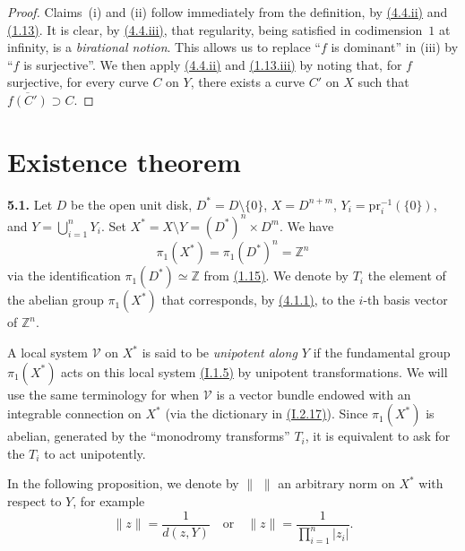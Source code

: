 \documentclass{report}
\newenvironment{rmenv}[1]
  {\phantomsection\par\medskip\noindent\textbf{#1.}\rmfamily}
  {\par\medskip}
\renewcommand{\cal}[1]{{\mathcal{#1}}}
\newcommand{\ZZ}{\mathbb{Z}}
\newcommand{\pr}{\mathrm{pr}}
\newcommand{\oldpage}[1]{\marginpar{\footnotesize$\Big\vert$ \textit{p.~#1}}}
\begin{document}
\begin{proof}
  Claims~(i) and (ii) follow immediately from the definition, by \hyperref[II.4.4]{(4.4.ii)}
\oldpage{91}
  and \hyperref[II.1.13]{(1.13)}.
  It is clear, by \hyperref[II.4.4]{(4.4.iii)}, that regularity, being satisfied in codimension~$1$ at infinity, is a \emph{birational notion}.
  This allows us to replace ``$f$ is dominant'' in (iii) by ``$f$ is surjective''.
  We then apply \hyperref[II.4.4]{(4.4.ii)} and \hyperref[II.1.13]{(1.13.iii)} by noting that, for $f$ surjective, for every curve $C$ on $Y$, there exists a curve $C'$ on $X$ such that $\overline{f(C')}\supset C$.
\end{proof}



\section{Existence theorem}
\label{II.5}

\begin{rmenv}{5.1}
\label{II.5.1}
  Let $D$ be the open unit disk, $D^*=D\setminus\{0\}$, $X=D^{n+m}$, $Y_i=\pr_i^{-1}(\{0\})$, and $Y=\bigcup_{i=1}^n Y_i$.
  Set $X^*=X\setminus Y=(D^*)^n\times D^m$.
  We have
  \[
  \label{II.5.1.1}
    \pi_1(X^*) = \pi_1(D^*)^n = \ZZ^n
  \tag{5.1.1}
  \]
  via the identification $\pi_1(D^*)\simeq\ZZ$ from \hyperref[II.1.15]{(1.15)}.
  We denote by $T_i$ the element of the abelian group $\pi_1(X^*)$ that corresponds, by \hyperref[II.4.1.1]{(4.1.1)}, to the $i$-th basis vector of $\ZZ^n$.

  A local system $\cal{V}$ on $X^*$ is said to be \emph{unipotent along $Y$} if the fundamental group $\pi_1(X^*)$ acts on this local system \hyperref[I.1.5]{(I.1.5)} by unipotent transformations.
  We will use the same terminology for when $\cal{V}$ is a vector bundle endowed with an integrable connection on $X^*$ (via the dictionary in \hyperref[I.2.17]{(I.2.17)}).
  Since $\pi_1(X^*)$ is abelian, generated by the ``monodromy transforms'' $T_i$, it is equivalent to ask for the $T_i$ to act unipotently.
\end{rmenv}

In the following proposition, we denote by $\|\,\,\|$ an arbitrary norm on $X^*$ with respect to $Y$, for example
\[
  \|z\| = \frac{1}{d(z,Y)}
  \quad\mbox{or}\quad
  \|z\| = \frac{1}{\prod_{i=1}^n|z_i|}.
\]
\end{document}

